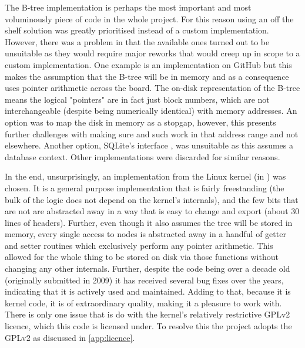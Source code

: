         The B-tree implementation is perhaps the most important and most
        voluminously piece of code in the whole project. For this reason using an
        off the shelf solution was greatly prioritised instead of a custom
        implementation. However, there was a problem in that the available ones turned out to be
        unsuitable as they would require major reworks that would creep up in
        scope to a custom implementation. One example is an implementation on
        GitHub \cite{GitHub_btree} but this makes the assumption that the
        B-tree will be in memory and as a consequence uses pointer arithmetic
        across the board. The on-disk representation of the B-tree means the
        logical "pointers" are in fact just block numbers, which are not
        interchangeable (despite being numerically identical) with memory addresses. An option
        was to map the disk in memory as a stopgap, however, this presents
        further challenges with making sure  and such work in
        that address range and not elsewhere. Another option, SQLite's
        interface \cite{SQLite_btree}, was unsuitable as this assumes a database
        context. Other implementations \cite{random_btree} were
        discarded for similar reasons.

        In the end, unsurprisingly, an implementation from the Linux kernel (in
         \cite{Linux_source}) was chosen. It is a
        general purpose \bplustree{} implementation that is fairly freestanding
        (the bulk of the logic does not depend on the kernel's internals), and
        the few bits that are not are abstracted away in a way that is easy to
        change and export (about 30 lines of headers). Further, even though it
        also assumes the tree will be stored in memory, every single access to
        nodes is abstracted away in a handful of getter and setter routines
        which exclusively perform any pointer arithmetic. This allowed for the
        whole thing to be stored on disk via those functions without changing
        any other internals. Further, despite the code being over a decade old
        (originally submitted in 2009) it has received several bug fixes over
        the years, indicating that it is actively used and maintained. Adding to
        that, because it is kernel code, it is of extraordinary quality, making
        it a pleasure to work with. There is only one issue that is do with the
        kernel's relatively restrictive GPLv2 licence, which this code is
        licensed under. To resolve this the project adopts the GPLv2 as
        discussed in \autoref{app:licence}.

